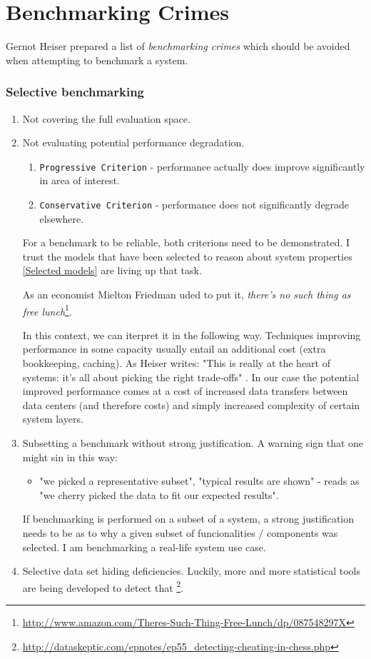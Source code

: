 \documentclass{uvamscse}
\begin{document}
\section{Benchmarking Crimes}

Gernot Heiser prepared a list \cite{GerHeiBench} of \textit{benchmarking crimes} which should be avoided when attempting to benchmark a system.

\subsubsection{Selective benchmarking}
\begin{enumerate}
  \item Not covering the full evaluation space.
  \item Not evaluating potential performance degradation.
    \begin{enumerate}
      \item \texttt{Progressive Criterion} - performance actually does improve significantly in area of interest.
      \item \texttt{Conservative Criterion} - performance does not significantly degrade elsewhere.
    \end{enumerate}
    For a benchmark to be reliable, both criterions need to be demonstrated. I trust the models that have been selected to reason about system properties \ref{Selected models} are living up that task.

    As an economist Mielton Friedman uded to put it, \textit{there's no such thing as free lunch}\footnote{\url{http://www.amazon.com/Theres-Such-Thing-Free-Lunch/dp/087548297X}}.

    In this context, we can iterpret it in the following way. Techniques improving performance in some capacity usually entail an additional cost (extra bookkeeping, caching). As Heiser writes: "This is really at the heart of systems: it's all about picking the right trade-offs" \cite{GerHeiBench}. In our case the potential improved performance comes at a cost of increased data transfers between data centers (and therefore costs) and simply increased complexity of certain system layers.
  \item Subsetting a benchmark without strong justification. A warning sign that one might sin in this way:
    \begin{itemize}
      \item "we picked a representative subset", "typical results are shown" - reads as "we cherry picked the data to fit our expected results".
    \end{itemize}
    If benchmarking is performed on a subset of a system, a strong justification needs to be as to why a given subset of funcionalities / components was selected. I am benchmarking a real-life system use case.
  \item Selective data set hiding deficiencies. Luckily, more and more statistical tools are being developed to detect that \footnote{\url{http://dataskeptic.com/epnotes/ep55_detecting-cheating-in-chess.php}}.
\end{enumerate}
\end{document}
